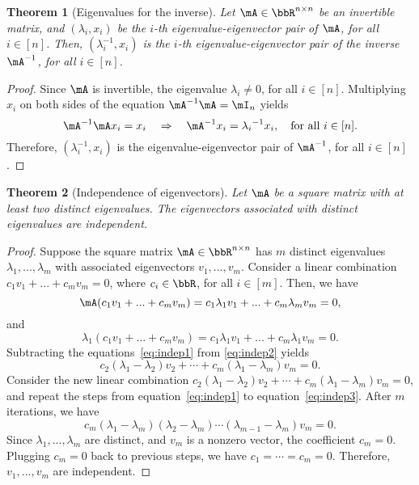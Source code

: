 \documentclass[11pt]{article}
\theoremstyle{plain}
\newtheorem{thm}{Theorem}[section]
\theoremstyle{definition}
\begin{document}
\begin{thm}[Eigenvalues for the inverse]
Let $\mA \in \bbR^{n \times n}$ be an invertible matrix, and $(\lambda_i, x_i)$ be the $i$-th eigenvalue-eigenvector pair of $\mA$, for all $i \in [n]$. Then, $(\lambda^{-1}_i, x_i)$ is the $i$-th eigenvalue-eigenvector pair of the inverse $\mA^{-1}$, for all $i \in [n]$.
\end{thm}

\begin{proof}
	Since $\mA$ is invertible, the eigenvalue $\lambda_i \neq 0$, for all $  i \in [n]$. Multiplying $x_i$ on both sides of the equation $\mA^{-1} \mA = \mI_n$ yields
	\[ \mA^{-1} \mA x_i = x_i \quad \Rightarrow\quad  \mA^{-1} x_i = {\lambda_i}^{-1} x_i, \quad \text{for all } i \in [n]. \]
Therefore, $(\lambda_i^{-1},x_i)$ is the eigenvalue-eigenvector pair of $\mA^{-1}$, for all $i \in [n]$.
\end{proof}

\begin{thm}[Independence of eigenvectors]\label{thm:indepeigen} 
Let $\mA$ be a square matrix with at least two distinct eigenvalues. The eigenvectors associated with distinct eigenvalues are independent.
\end{thm}

\begin{proof}
	Suppose the square matrix $\mA \in \bbR^{n \times n}$ has $m$ distinct eigenvalues $\lambda_1,...,\lambda_m$ with associated eigenvectors  $v_1,...,v_m$. Consider a linear combination $c_1 v_1 + ... + c_m v_m = 0$, where $c_i \in \bbR$, for all $i \in [m]$.	
	Then, we have
	\begin{equation}\label{eq:indep1}
		\mA(c_1 v_1 + ... + c_m v_m ) = c_1 \lambda_1 v_1 + ... + c_m \lambda_m v_m = 0,
		\end{equation}
		and
		\begin{equation}\label{eq:indep2}
		\lambda_1 (c_1 v_1 + ... + c_m v_m ) = c_1 \lambda_1 v_1 + ... + c_m \lambda_1 v_m = 0. 
	\end{equation}
	Subtracting the equations~\eqref{eq:indep1} from \eqref{eq:indep2} yields
	\begin{equation}\label{eq:indep3}
		 c_2 (\lambda_1 - \lambda_2) v_2 + \cdots + c_m (\lambda_1 - \lambda_m) v_m  = 0.
	\end{equation}
	Consider the new linear combination $ c_2 (\lambda_1 - \lambda_2) v_2 + \cdots + c_m (\lambda_1 - \lambda_m) v_m = 0$, and repeat the steps from equation~\eqref{eq:indep1} to equation~\eqref{eq:indep3}. After $m$ iterations, we have 
	\[ c_m(\lambda_1 - \lambda_m)(\lambda_2 - \lambda_m)\cdots (\lambda_{m-1} - \lambda_m) v_m = 0.    \]
	 Since $\lambda_1 ,..., \lambda_m$ are distinct, and $v_m$ is a nonzero vector, the coefficient $c_m = 0$.  Plugging $c_m = 0$ back to previous steps, we have $c_1 = \cdots = c_m = 0$. Therefore, $v_1,...,v_m$ are independent.
\end{proof}
\end{document}

